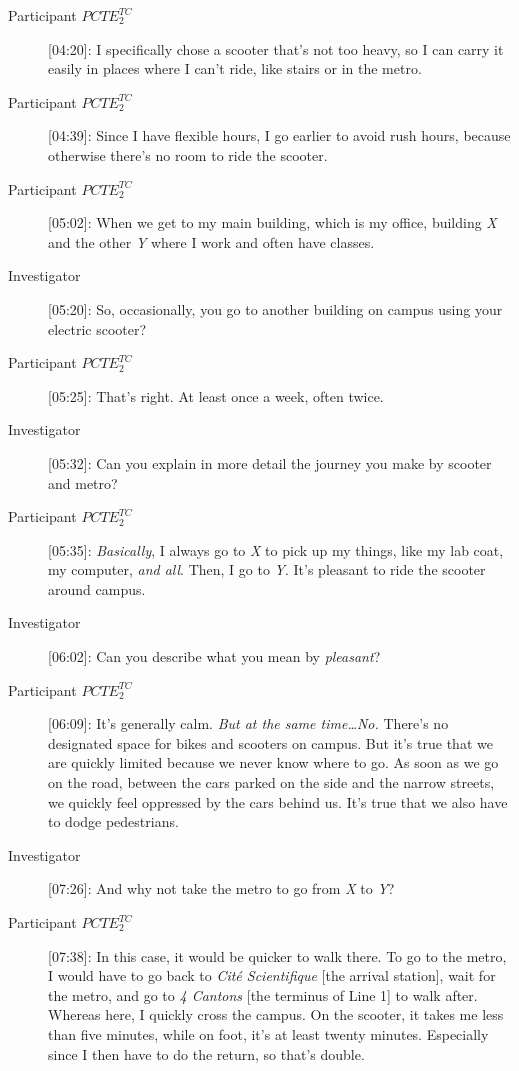 \begin{description}
    \item[Participant \(PCTE^{TC}_{2}\)] [04:20]: I specifically chose a scooter that’s not too heavy, so I can carry it easily in places where I can’t ride, like stairs or in the metro.
    \item[Participant \(PCTE^{TC}_{2}\)] [04:39]: Since I have flexible hours, I go earlier to avoid rush hours, because otherwise there’s no room to ride the scooter.
    \item[Participant \(PCTE^{TC}_{2}\)] [05:02]: When we get to my main building, which is my office, building \textsl{X} and the other \textsl{Y} where I work and often have classes.
    \item[Investigator] [05:20]: So, occasionally, you go to another building on campus using your electric scooter?
    \item[Participant \(PCTE^{TC}_{2}\)] [05:25]: That’s right. At least once a week, often twice.
    \item[Investigator] [05:32]: Can you explain in more detail the journey you make by scooter and metro?
    \item[Participant \(PCTE^{TC}_{2}\)] [05:35]: \textsl{Basically}, I always go to \textsl{X} to pick up my things, like my lab coat, my computer, \textsl{and all}. Then, I go to \textsl{Y}. It’s pleasant to ride the scooter around campus.
    \item[Investigator] [06:02]: Can you describe what you mean by \textsl{pleasant}?
    \item[Participant \(PCTE^{TC}_{2}\)] [06:09]: It’s generally calm. \textsl{But at the same time\dots No.} There’s no designated space for bikes and scooters on campus. But it’s true that we are quickly limited because we never know where to go. As soon as we go on the road, between the cars parked on the side and the narrow streets, we quickly feel oppressed by the cars behind us. It’s true that we also have to dodge pedestrians.
    \item[Investigator] [07:26]: And why not take the metro to go from \textsl{X} to \textsl{Y}?
    \item[Participant \(PCTE^{TC}_{2}\)] [07:38]: In this case, it would be quicker to walk there. To go to the metro, I would have to go back to \textsl{Cité Scientifique} [the arrival station], wait for the metro, and go to \textsl{4 Cantons} [the terminus of Line 1] to walk after. Whereas here, I quickly cross the campus. On the scooter, it takes me less than five minutes, while on foot, it’s at least twenty minutes. Especially since I then have to do the return, so that’s double.

\end{description}

